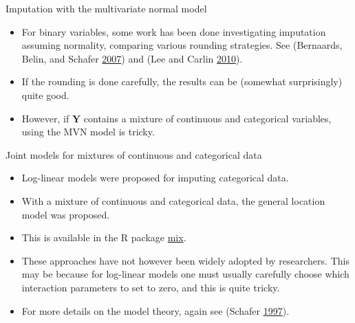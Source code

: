 \documentclass[ignorenonframetext,]{beamer}
\providecommand{\tightlist}{%
  \setlength{\itemsep}{0pt}\setlength{\parskip}{0pt}}
\begin{document}
\begin{frame}{Imputation with the multivariate normal model}
\protect\hypertarget{imputation-with-the-multivariate-normal-model-1}{}

\begin{itemize}
\tightlist
\item
  For binary variables, some work has been done investigating imputation
  assuming normality, comparing various rounding strategies. See
  (Bernaards, Belin, and Schafer
  \protect\hyperlink{ref-Bernaardsux2fBelin:2007}{2007}) and (Lee and
  Carlin \protect\hyperlink{ref-Leeux2fCarlin:2010}{2010}).
\item
  If the rounding is done carefully, the results can be (somewhat
  surprisingly) quite good.
\item
  However, if \(\mathbf Y\) contains a mixture of continuous and
  categorical variables, using the MVN model is tricky.
\end{itemize}

\end{frame}

\begin{frame}{Joint models for mixtures of continuous and categorical
data}
\protect\hypertarget{joint-models-for-mixtures-of-continuous-and-categorical-data}{}

\begin{itemize}
\tightlist
\item
  Log-linear models were proposed for imputing categorical data.
\item
  With a mixture of continuous and categorical data, the general
  location model was proposed.
\item
  This is available in the R package
  \href{https://cran.r-project.org/package=mix}{mix}.
\item
  These approaches have not however been widely adopted by researchers.
  This may be because for log-linear models one must usually carefully
  choose which interaction parameters to set to zero, and this is quite
  tricky.
\item
  For more details on the model theory, again see (Schafer
  \protect\hyperlink{ref-Schafer:1997}{1997}).
\end{itemize}

\end{frame}
\end{document}
